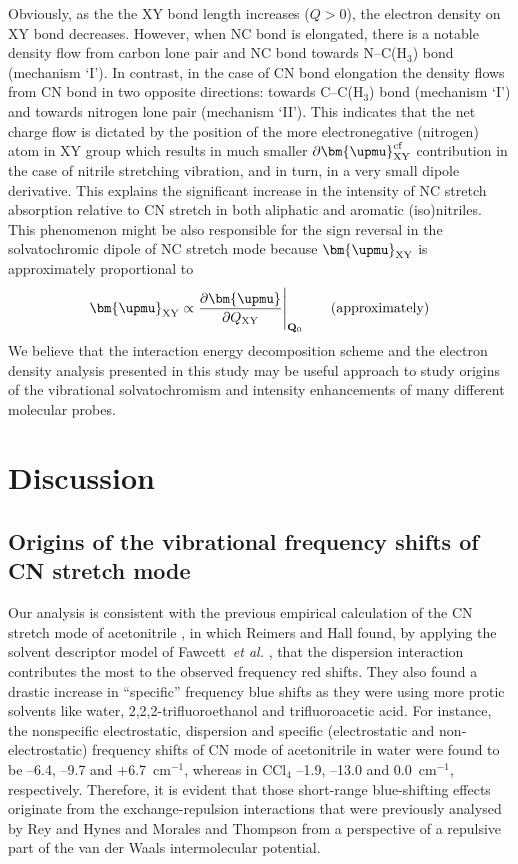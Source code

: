 \documentclass[a4paper,titlepage,twoside,fleqn,12pt]{book}
\newcommand{\BM}[1]{\bm{#1}}
\newcommand{\fderiv}[2]{\ensuremath{
    \frac{\partial #1}{\partial #2}}}
\begin{document}
\begin{refsection}
Obviously, as the
the XY bond length increases ($Q>0$), the electron density on XY bond decreases. However, 
when NC bond is elongated, there is a notable density flow from carbon lone pair and NC 
bond towards N--C(H$_3$) bond (mechanism `I'). In contrast, in the case of CN bond elongation 
the density flows from CN bond in two opposite directions: towards C--C(H$_3$) bond 
(mechanism `I') and towards nitrogen lone pair (mechanism `II'). This indicates that the net 
charge flow is dictated by the position of the more electronegative (nitrogen) atom in XY group 
which results in much smaller $\partial {\BM \upmu}_{\rm XY}^{\rm cf}$ contribution in the case of
nitrile stretching vibration,
and in turn, in a very small dipole derivative. This explains the significant increase in the 
intensity of NC stretch absorption relative to CN stretch in both aliphatic and aromatic 
(iso)nitriles. This phenomenon might be also responsible for the sign reversal in the
solvatochromic dipole of NC stretch mode because ${\BM \upmu}_{\rm XY}$ is approximately proportional to
%
\begin{equation}
 {\BM \upmu}_{\rm XY} \propto \fderiv{{\BM \upmu}}{Q_{\rm XY}} \Bigg|_{{\bf Q}_{0}} 
    \qquad\text{(approximately)}
\end{equation}
%
We believe that the interaction energy decomposition scheme and the electron density
analysis presented in this study may be useful approach to study origins of the vibrational
solvatochromism and intensity enhancements of many different molecular probes.


\section{Discussion}

\subsection{Origins of the vibrational frequency shifts of CN stretch mode}

Our analysis is consistent with the previous empirical
calculation of the CN stretch mode of acetonitrile \citep{Reimers.Hall.JACS.1999}, 
in which
Reimers and Hall found, by applying the solvent descriptor
model of Fawcett~\emph{et al.} \citep{Fawcett.Liu.Kessler.JPC.1993}, 
that the dispersion interaction
contributes the most to the observed frequency red shifts.
They also found a drastic increase in ``specific'' frequency blue
shifts as they were using more protic solvents like water, 
2,2,2\hyp{}trifluoroethanol and trifluoroacetic acid. For instance, the nonspecific
electrostatic, dispersion and specific (electrostatic and
non-electrostatic) frequency shifts of CN mode of acetonitrile
in water were found to be --6.4, --9.7 and +6.7~cm$^{-1}$, whereas in
CCl$_4$ --1.9, --13.0 and 0.0~cm$^{-1}$, respectively. Therefore, it is
evident that those short\hyp{}range blue\hyp{}shifting effects originate
from the exchange\hyp{}repulsion interactions that were previously
analysed by Rey and Hynes \citep{Rey.Hynes.JCP.1998} 
and Morales and Thompson \citep{Morales.Thompson.JPCB.2011}
from a perspective of a repulsive part of the van der Waals
intermolecular potential.


\end{refsection}
\end{document}
